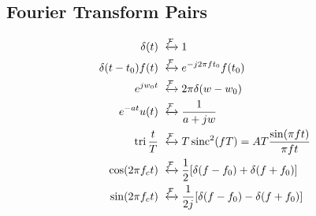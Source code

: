 \subsection{Fourier Transform Pairs}
\begin{align*}
    \delta(t) &\xleftrightarrow{\mathcal{F}} 1\\
    \delta(t-t_0)f(t) &\xleftrightarrow{\mathcal{F}} e^{-j2\pi ft_0}f(t_0)\\
    e^{jw_0t} &\xleftrightarrow{\mathcal{F}} 2\pi \delta(w-w_0)\\
    e^{-at}u(t) &\xleftrightarrow{\mathcal{F}} \frac{1}{a + jw}\\
    \tri \frac{t}{T} &\xleftrightarrow{\mathcal{F}} T\sinc^2 (fT) = AT\frac{\sin (\pi ft)}{\pi ft}\\
    \cos (2\pi f_c t) &\xleftrightarrow{\mathcal{F}} \frac{1}{2}[\delta(f-f_0) + \delta(f + f_0)]\\
    \sin (2\pi f_c t) &\xleftrightarrow{\mathcal{F}} \frac{1}{2j}[\delta(f-f_0) - \delta(f + f_0)]
\end{align*}